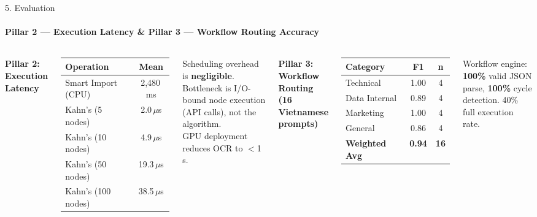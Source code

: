 \documentclass[10pt,aspectratio=169]{beamer}
\begin{document}
\begin{frame}{5. Evaluation}
    \framesubtitle{Pillar 2 --- Execution Latency \& Pillar 3 --- Workflow Routing Accuracy}

    \begin{columns}
        \textbf{Pillar 2: Execution Latency}
        \begin{table}
            \centering\footnotesize
            \begin{tabular}{lc}
                \toprule
                \textbf{Operation} & \textbf{Mean} \\
                \midrule
                Smart Import (CPU) & 2,480\,ms \\
                Kahn's (5 nodes)   & 2.0\,$\mu$s \\
                Kahn's (10 nodes)  & 4.9\,$\mu$s \\
                Kahn's (50 nodes)  & 19.3\,$\mu$s \\
                Kahn's (100 nodes) & 38.5\,$\mu$s \\
                \bottomrule
            \end{tabular}
        \end{table}
        \small
        Scheduling overhead is \textbf{negligible}. Bottleneck is I/O-bound node execution (API calls), not the algorithm.\\
        GPU deployment reduces OCR to $<$1\,s.

        \textbf{Pillar 3: Workflow Routing (16 Vietnamese prompts)}
        \begin{table}
            \centering\footnotesize
            \begin{tabular}{lcc}
                \toprule
                \textbf{Category} & \textbf{F1} & \textbf{n} \\
                \midrule
                Technical    & 1.00 & 4 \\
                Data Internal & 0.89 & 4 \\
                Marketing    & 1.00 & 4 \\
                General      & 0.86 & 4 \\
                \midrule
                \textbf{Weighted Avg} & \textbf{0.94} & \textbf{16} \\
                \bottomrule
            \end{tabular}
        \end{table}
        \small
        Workflow engine: \textbf{100\%} valid JSON parse, \textbf{100\%} cycle detection. 40\% full execution rate.
    \end{columns}
\end{frame}
\end{document}
